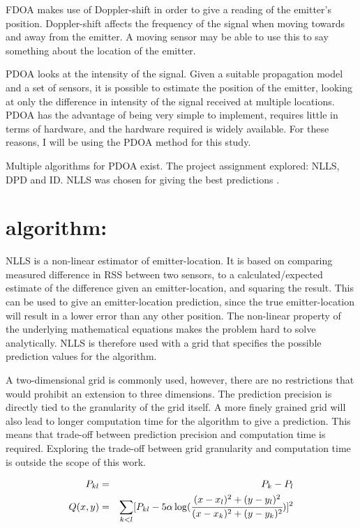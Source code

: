 \documentclass[10pt,a4paper]{book}
\begin{document}
\Gls{FDOA} makes use of Doppler-shift in order to give a reading of the emitter's position. Doppler-shift affects the frequency of the signal when moving towards and away from the emitter. A moving sensor may be able to use this to say something about the location of the emitter.

\Gls{PDOA} looks at the intensity of the signal. Given a suitable propagation model and a set of sensors, it is possible to estimate the position of the emitter, looking at only the difference in intensity of the signal received at multiple locations. \Gls{PDOA} has the advantage of being very simple to implement, requires little in terms of hardware, and the hardware required is widely available. For these reasons, I will be using the \Gls{PDOA} method for this study.

Multiple algorithms for \gls{PDOA} exist. The project assignment explored: \gls{NLLS}, \gls{DPD} and \gls{ID}. \Gls{NLLS} was chosen for giving the best predictions \cite*{jackson2011emitter}.

\newpage

\section{ algorithm: }
\label{PDOANLLS}
\gls{NLLS} is a non-linear estimator of emitter-location. It is based on comparing measured difference in \gls{RSS} between two sensors, to a calculated/expected estimate of the difference given an emitter-location, and squaring the result. This can be used to give an emitter-location prediction, since the true emitter-location will result in a lower error than any other position. The non-linear property of the underlying mathematical equations makes the problem hard to solve analytically. \Gls{NLLS} is therefore used with a grid that specifies the possible prediction values for the algorithm. 

A two-dimensional grid is commonly used, however, there are no restrictions that would prohibit an extension to three dimensions. The prediction precision is directly tied to the granularity of the grid itself. A more finely grained grid will also lead to longer computation time for the algorithm to give a prediction. This means that trade-off between prediction precision and computation time is required. Exploring the trade-off between grid granularity and computation time is outside the scope of this work.

\begin{eqnarray}
P_{kl} &=& P_k - P_l \label{Pkl}\\
Q(x,y) &=& \sum_{k<l} [P_{kl} - 5 \alpha \log (\cfrac{(x-x_l)^2 + (y-y_l)^2}{(x-x_k)^2 + (y-y_k)^2})]^2\label{NLLSQxy}
\end{eqnarray}
\end{document}
